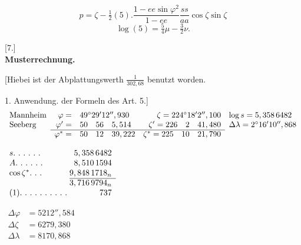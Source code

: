 \clearpage
\noindent\makebox[12mm][l]{}\par\medskip
{}
\[
p=\zeta-\tfrac12(5).\frac{1-ee\sin\varphi^2}{1-ee}\frac{ss}{aa}\cos\zeta\sin\zeta
\]
\[\log(5)=\tfrac54\mu-\tfrac32\nu.\]
\begin{center}[7.]\\[.5ex]\textbf{Musterrechnung.}\end{center}

[Hiebei ist der Abplattungswerth \(\frac1{302,68}\) benutzt worden.

1. Anwendung. der Formeln des Art. 5.]
\begingroup\small
\[
\begin{array}{lrlrl}
\text{Mannheim}&\varphi=&49^\circ29'12'',930&\zeta=224^\circ18'2'',100&\log s=5,358\,6482\\
\text{Seeberg}&\varphi'=&50\quad56\quad5,514&\zeta'=226\quad2\quad41,480&\Delta\lambda=2^\circ16'10'',868\\\cline{2-4}
&\varphi^*=&50\quad12\quad39,222&\zeta^*=225\quad10\quad21,790&
\end{array}
\]
\noindent\begin{minipage}[t]{.28\linewidth}\vspace{0pt}\centering
\(\begin{array}{l@{\;}r}
s\ldotp\,\ldotp\,\ldotp\,\ldotp\,\ldotp\,\ldotp&5,358\,6482\\
A\ldotp\,\ldotp\,\ldotp\,\ldotp\,\ldotp\,\ldotp&8,510\,1594\\
\cos\zeta^*\ldotp\,\ldotp\,\ldotp&9,848\,1718_n\\\cline{2-2}
&3,716\,9794_n\\
(1)\ldotp\,\ldotp\,\ldotp\,\ldotp\,\ldotp\,\ldotp\,\ldotp\,\ldotp\,\ldotp\,\ldotp&737
\end{array}\)
\par\vspace{3.7ex}
\(\begin{aligned}
\Delta\varphi&=5212'',584\\
\Delta\zeta&=6279,380\\
\Delta\lambda&=8170,868
\end{aligned}\)
\end{minipage}\hfill
